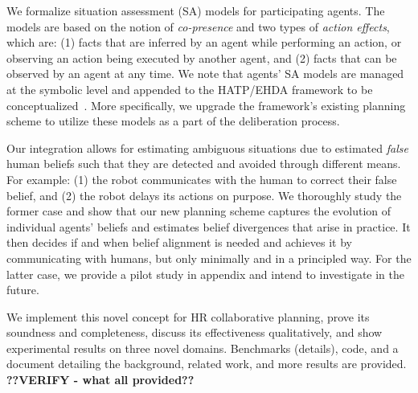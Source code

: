 \documentclass[letterpaper]{article} %
\begin{document}
We formalize situation assessment (SA) models for participating agents. 
The models are based on the notion of {\em co-presence} and two types of \textit{action effects}, which are: (1) facts that are inferred by an agent while performing an action, or observing an action being executed by another agent, and (2) facts that can be observed by an agent at any time.
We note that agents' SA models are managed at the symbolic level and appended to the HATP/EHDA framework to be conceptualized~\cite{buisan:hal-03684211}. 
More specifically, we upgrade the framework's existing planning scheme to utilize these models as a part of the deliberation process.   

Our integration allows for estimating ambiguous situations due to estimated \textit{false} human beliefs such that they are detected and avoided through different means. 
For example: (1) the robot communicates with the human to correct their false belief, and (2) the robot delays its actions on purpose. We thoroughly study the former case and show that our new planning scheme captures the evolution of individual agents' beliefs and estimates belief divergences that arise in practice. 
It then decides if and when belief alignment is needed and achieves it by communicating with humans, but only minimally and in a principled way. 
For the latter case, we provide a pilot study in appendix and intend to investigate in the future.   

We implement this novel concept for HR collaborative planning, prove its soundness and completeness, discuss its effectiveness qualitatively, and show experimental results on three novel domains. Benchmarks (details), code, and a document detailing the background, related work, and more results are provided. 
\textbf{??VERIFY - what all provided??}

\end{document}
